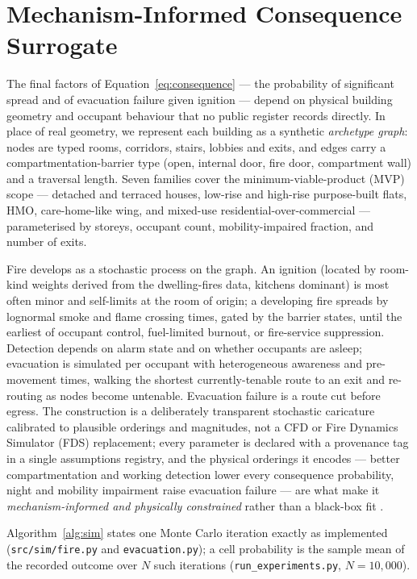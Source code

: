 \section{Mechanism-Informed Consequence Surrogate}
\label{sec:surrogate}

The final factors of Equation~\eqref{eq:consequence} --- the probability of
significant spread and of evacuation failure given ignition --- depend on physical
building geometry and occupant behaviour that no public register records directly.
In place of real geometry, we represent each building as a synthetic
\emph{archetype graph}: nodes are typed rooms, corridors, stairs, lobbies and
exits, and edges carry a compartmentation-barrier type (open, internal door, fire
door, compartment wall) and a traversal length. Seven families cover the
minimum-viable-product (MVP) scope --- detached and terraced houses, low-rise and
high-rise purpose-built flats, HMO,
care-home-like wing, and mixed-use residential-over-commercial --- parameterised by
storeys, occupant count, mobility-impaired fraction, and number of exits.

Fire develops as a stochastic process on the graph. An ignition (located by
room-kind weights derived from the dwelling-fires data, kitchens dominant) is most
often minor and self-limits at the room of origin; a developing fire spreads by
lognormal smoke and flame crossing times, gated by the barrier states, until the
earliest of occupant control, fuel-limited burnout, or fire-service suppression.
Detection depends on alarm state and on whether occupants are asleep; evacuation is
simulated per occupant with heterogeneous awareness and pre-movement times, walking
the shortest currently-tenable route to an exit and re-routing as nodes become
untenable. Evacuation failure is a route cut before egress. The construction is a
deliberately transparent stochastic caricature calibrated to plausible orderings
and magnitudes, not a CFD or Fire Dynamics Simulator (FDS) replacement; every
parameter is declared with a
provenance tag in a single assumptions registry, and the physical orderings it
encodes --- better compartmentation and working detection lower every consequence
probability, night and mobility impairment raise evacuation failure --- are what
make it \emph{mechanism-informed and physically constrained} rather than a black-box fit
\citep{yarmohammadian2025pism,yildiz2025ml}.

Algorithm~\ref{alg:sim} states one Monte Carlo iteration exactly as implemented
(\texttt{src/sim/fire.py} and \texttt{evacuation.py}); a cell probability is the
sample mean of the recorded outcome over $N$ such iterations
(\texttt{run\_experiments.py}, $N=10{,}000$).


